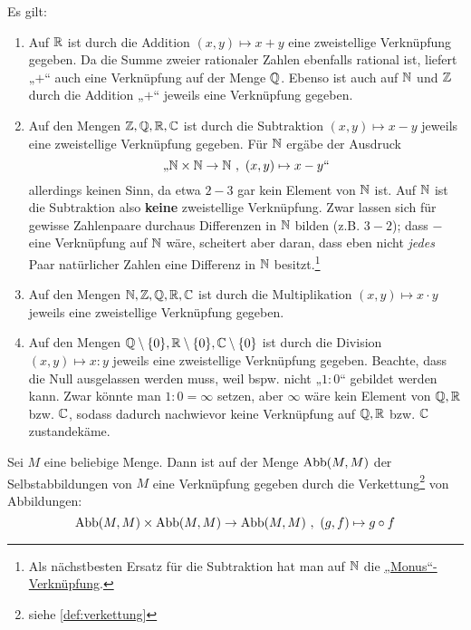 \begin{bsp}[Grundrechenarten] \label{bsp:verknuepfung}
    Es gilt:
    \begin{enumerate}
        \item Auf $\mathbb R$ ist durch die Addition $(x,y)\mapsto x+y$ eine zweistellige Verknüpfung gegeben. Da die Summe zweier rationaler Zahlen ebenfalls rational ist, liefert „$+$“ auch eine Verknüpfung auf der Menge $\mathbb Q$. Ebenso ist auch auf $\mathbb N$ und $\mathbb Z$ durch die Addition „$+$“ jeweils eine Verknüpfung gegeben.
        \item Auf den Mengen $\mathbb Z,\mathbb Q,\mathbb R,\mathbb C$ ist durch die Subtraktion $(x,y)\mapsto x-y$ jeweils eine zweistellige Verknüpfung gegeben. Für $\mathbb N$ ergäbe der Ausdruck
        \[ \text{„$\mathbb N \times \mathbb N \to \mathbb N \ ,\ (x,y) \mapsto x-y$“} \]
        allerdings keinen Sinn, da etwa $2-3$ gar kein Element von $\mathbb N$ ist. Auf $\mathbb N$ ist die Subtraktion also \textbf{keine} zweistellige Verknüpfung. Zwar lassen sich für gewisse Zahlenpaare durchaus Differenzen in $\mathbb N$ bilden (z.B. $3-2$); dass $-$ eine Verknüpfung auf $\mathbb N$ wäre, scheitert aber daran, dass eben nicht \emph{jedes} Paar natürlicher Zahlen eine Differenz in $\mathbb N$ besitzt.\footnote{Als nächstbesten Ersatz für die Subtraktion hat man auf $\mathbb N$ die \href{https://en.wikipedia.org/wiki/Monus\#Natural_numbers}{„Monus“-Verknüpfung}.}
        \item Auf den Mengen $\mathbb N,\mathbb Z,\mathbb Q,\mathbb R,\mathbb C$ ist durch die Multiplikation $(x,y)\mapsto x\cdot y$ jeweils eine zweistellige Verknüpfung gegeben.
        \item Auf den Mengen $\mathbb Q\setminus \{0\},\mathbb R\setminus \{0\},\mathbb C\setminus \{0\}$ ist durch die Division $(x,y)\mapsto x:y$ jeweils eine zweistellige Verknüpfung gegeben. Beachte, dass die Null ausgelassen werden muss, weil bspw. nicht „$1:0$“ gebildet werden kann. Zwar könnte man $1:0=\infty$ setzen, aber $\infty$ wäre kein Element von $\mathbb Q,\mathbb R$ bzw. $\mathbb C$, sodass dadurch nachwievor keine Verknüpfung auf $\mathbb Q,\mathbb R$ bzw. $\mathbb C$ zustandekäme.
    \end{enumerate}
\end{bsp}


\begin{bsp}
    Sei $M$ eine beliebige Menge. Dann ist auf der Menge $\operatorname{Abb}(M,M)$ der Selbstabbildungen von $M$ eine Verknüpfung gegeben durch die Verkettung\footnote{siehe \cref{def:verkettung}} von Abbildungen:
        \[ \operatorname{Abb}(M,M)\times \operatorname{Abb}(M,M)\to \operatorname{Abb}(M,M) \ ,\ (g,f)\mapsto g\circ f \]
\end{bsp}


